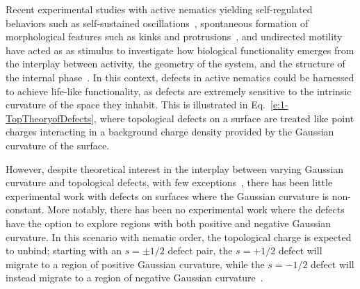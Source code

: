 Recent experimental studies with active nematics yielding self-regulated behaviors such as self-sustained oscillations~\cite{RN9}, spontaneous formation of morphological features such as kinks and protrusions~\cite{RN9,RN3}, and undirected motility~\cite{RN9,RN3} have acted as as stimulus to investigate how biological functionality emerges from the interplay between activity, the geometry of the system, and the structure of the internal phase~\cite{RN160,RN51,RN10}.
In this context, defects in active nematics could be harnessed to achieve life-like functionality, as defects are extremely sensitive to the intrinsic curvature of the space they inhabit.
This is illustrated in Eq.~\ref{e:1-TopTheoryofDefects}, where topological defects on a surface are treated like point charges interacting in a background charge density provided by the Gaussian curvature of the surface.

However, despite theoretical interest in the interplay between varying Gaussian curvature and topological defects, with few exceptions~\cite{RN84,RN25,RN73,RN81}, there has been little experimental work with defects on surfaces where the Gaussian curvature is non-constant.
More notably, there has been no experimental work where the defects have the option to explore regions with both positive and negative Gaussian curvature.
In this scenario with nematic order, the topological charge is expected to unbind; starting with an $s = \pm 1/2$ defect pair, the $s = +1/2$ defect will migrate to a region of positive Gaussian curvature, while the $s=  -1/2$ defect will instead migrate to a region of negative Gaussian curvature~\cite{RN17,RN19,RN22}.


